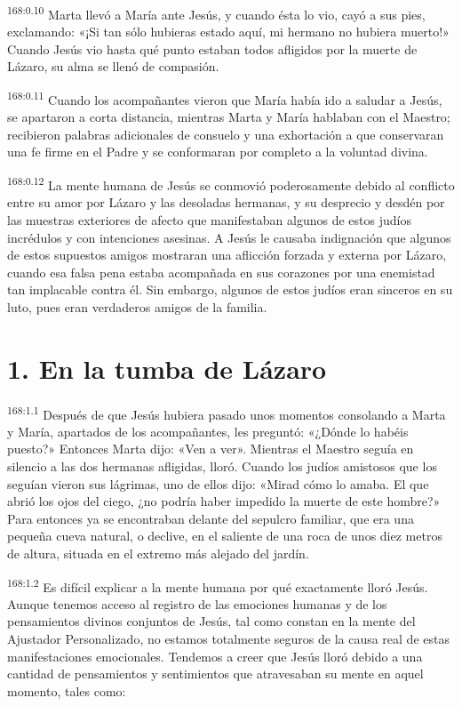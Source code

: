 \par 
\textsuperscript{168:0.10} Marta llevó a María ante Jesús, y cuando ésta lo vio, cayó a sus pies, exclamando: «¡Si tan sólo hubieras estado aquí, mi hermano no hubiera muerto!» Cuando Jesús vio hasta qué punto estaban todos afligidos por la muerte de Lázaro, su alma se llenó de compasión.

\par 
\textsuperscript{168:0.11} Cuando los acompañantes vieron que María había ido a saludar a Jesús, se apartaron a corta distancia, mientras Marta y María hablaban con el Maestro; recibieron palabras adicionales de consuelo y una exhortación a que conservaran una fe firme en el Padre y se conformaran por completo a la voluntad divina.

\par 
\textsuperscript{168:0.12} La mente humana de Jesús se conmovió poderosamente debido al conflicto entre su amor por Lázaro y las desoladas hermanas, y su desprecio y desdén por las muestras exteriores de afecto que manifestaban algunos de estos judíos incrédulos y con intenciones asesinas. A Jesús le causaba indignación que algunos de estos supuestos amigos mostraran una aflicción forzada y externa por Lázaro, cuando esa falsa pena estaba acompañada en sus corazones por una enemistad tan implacable contra él. Sin embargo, algunos de estos judíos eran sinceros en su luto, pues eran verdaderos amigos de la familia.

\section*{1. En la tumba de Lázaro}
\par 
\textsuperscript{168:1.1} Después de que Jesús hubiera pasado unos momentos consolando a Marta y María, apartados de los acompañantes, les preguntó: «¿Dónde lo habéis puesto?» Entonces Marta dijo: «Ven a ver». Mientras el Maestro seguía en silencio a las dos hermanas afligidas, lloró. Cuando los judíos amistosos que los seguían vieron sus lágrimas, uno de ellos dijo: «Mirad cómo lo amaba. El que abrió los ojos del ciego, ¿no podría haber impedido la muerte de este hombre?» Para entonces ya se encontraban delante del sepulcro familiar, que era una pequeña cueva natural, o declive, en el saliente de una roca de unos diez metros de altura, situada en el extremo más alejado del jardín.

\par 
\textsuperscript{168:1.2} Es difícil explicar a la mente humana por qué exactamente lloró Jesús. Aunque tenemos acceso al registro de las emociones humanas y de los pensamientos divinos conjuntos de Jesús, tal como constan en la mente del Ajustador Personalizado, no estamos totalmente seguros de la causa real de estas manifestaciones emocionales. Tendemos a creer que Jesús lloró debido a una cantidad de pensamientos y sentimientos que atravesaban su mente en aquel momento, tales como:

